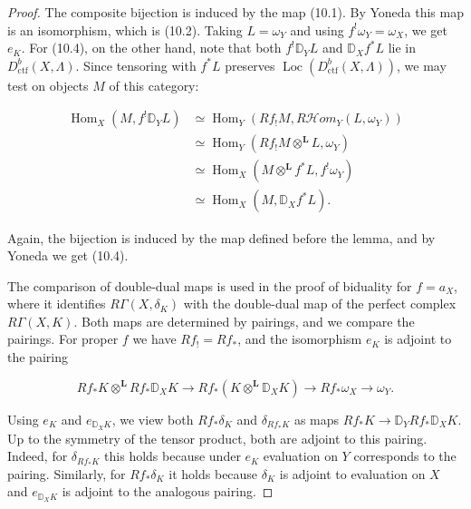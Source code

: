 \documentclass[11pt]{article}
\providecommand{\Hom}{}\renewcommand{\Hom}{\operatorname{Hom}}
\providecommand{\Loc}{}\renewcommand{\Loc}{\operatorname{Loc}}
\providecommand{\cHom}{}\renewcommand{\cHom}{R\mathcal{H}\!om}
\begin{document}
\begin{proof}[{Proof}]
The composite bijection is induced by the map (10.1). By Yoneda this map is an isomorphism, which is (10.2). Taking \(L=\omega_Y\) and using \(f^!\omega_Y=\omega_X\), we get \(e_K\). For (10.4), on the other hand, note that both \(f^!\mathbb D_YL\) and \(\mathbb D_Xf^*L\) lie in \(D^b_{\mathrm{ctf}}(X,\Lambda)\). Since tensoring with \(f^*L\) preserves \(\Loc(D^b_{\mathrm{ctf}}(X,\Lambda))\), we may test on objects \(M\) of this category:

\[
\begin{aligned}
\Hom_X(M,f^!\mathbb D_YL)
&\simeq\Hom_Y(Rf_!M,\cHom_Y(L,\omega_Y))\\
&\simeq\Hom_Y(Rf_!M\otimes^{\mathbf L}L,\omega_Y)\\
&\simeq\Hom_X(M\otimes^{\mathbf L}f^*L,f^!\omega_Y)\\
&\simeq\Hom_X(M,\mathbb D_Xf^*L).
\end{aligned}
\]

Again, the bijection is induced by the map defined before the lemma, and by Yoneda we get (10.4).

The comparison of double-dual maps is used in the proof of biduality for \(f=a_X\), where it identifies \(R\Gamma(X,\delta_K)\) with the double-dual map of the perfect complex \(R\Gamma(X,K)\). Both maps are determined by pairings, and we compare the pairings. For proper \(f\) we have \(Rf_!=Rf_*\), and the isomorphism \(e_K\) is adjoint to the pairing

\[
Rf_*K\otimes^{\mathbf L}Rf_*\mathbb D_XK
\longrightarrow Rf_*(K\otimes^{\mathbf L}\mathbb D_XK)
\longrightarrow Rf_*\omega_X\longrightarrow\omega_Y.
\]

Using \(e_K\) and \(e_{\mathbb D_XK}\), we view both \(Rf_*\delta_K\) and \(\delta_{Rf_*K}\) as maps \(Rf_*K\to\mathbb D_YRf_*\mathbb D_XK\). Up to the symmetry of the tensor product, both are adjoint to this pairing. Indeed, for \(\delta_{Rf_*K}\) this holds because under \(e_K\) evaluation on \(Y\) corresponds to the pairing. Similarly, for \(Rf_*\delta_K\) it holds because \(\delta_K\) is adjoint to evaluation on \(X\) and \(e_{\mathbb D_XK}\) is adjoint to the analogous pairing.
\end{proof}


\end{document}
